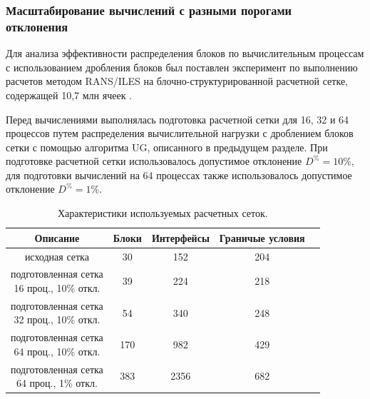 \subsubsection{Масштабирование вычислений с разными порогами \\ отклонения}

Для анализа эффективности распределения блоков по вычислительным процессам с использованием дробления блоков был поставлен эксперимент по выполнению расчетов методом RANS/ILES на блочно-структурированной расчетной сетке, содержащей 10,7 млн ячеек \cite{Savin2019RANS}.

Перед вычислениями выполнялась подготовка расчетной сетки для 16, 32 и 64 процессов путем распределения вычислительной нагрузки с дроблением блоков сетки с помощью алгоритма UG, описанного в предыдущем разделе.
При подготовке расчетной сетки использовалось допустимое отклонение $D^{\%} = 10\%$, для подготовки вычислений на 64 процессах также использовалось допустимое отклонение $D^{\%} = 1\%$.

\begin{table}[!ht]
\centering
\singlespacing
{}\caption{Характеристики используемых расчетных сеток.}
\bigskip
\label{tbl:text_2_withcut}
\begin{tabular}{ | c | c | c | c | c | }
  \hline
  Описание & Блоки & Интерфейсы & Граничые условия \\ \hline\hline
  исходная сетка & 30 & 152 & 204 \\ \hline\hline
  \makecell{подготовленная сетка \\ 16 проц., 10\% откл.} & 39 & 224 & 218 \\ \hline
  \makecell{подготовленная сетка \\ 32 проц., 10\% откл.} & 54 & 340 & 248 \\ \hline
  \makecell{подготовленная сетка \\ 64 проц., 10\% откл.} & 170 & 982 & 429 \\ \hline\hline
  \makecell{подготовленная сетка \\ 64 проц., 1\% откл.} & 383 & 2356 & 682 \\ \hline
\end{tabular}
\end{table}

